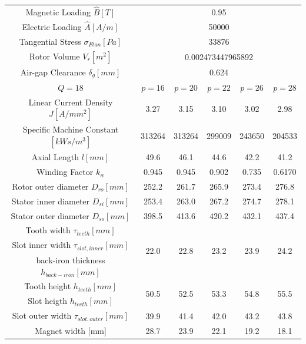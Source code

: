 \documentclass [a4 paper, 11pt, titlepage] {article}
\begin{document}
	\begin{table}[h]
		\begin{center}
			\begin{tabular}{c|c|c|c|c|c}
				Magnetic Loading $\hat{B}[T]$ & \multicolumn{5}{c}{0.95} \\
				Electric Loading $\hat{A}[A/m]$ & \multicolumn{5}{c}{50000} \\
				Tangential Stress $\sigma_{Ftan}[Pa]$ & \multicolumn{5}{c}{33876} \\
				Rotor Volume $V_r [m^2]$ & \multicolumn{5}{c}{0.002473447965892} \\
				Air-gap Clearance $\delta_g [mm]$ & \multicolumn{5}{c}{0.624} \\
				\hline\hline
				$Q=18$ & $p=16$ & $p=20$ & $p=22$ & $p=26$ & $p=28$ \\
				\hline
				Linear Current Density $J [A/mm^2]$ & 3.27 & 3.15 & 3.10 & 3.02 & 2.98 \\
				Specific Machine Constant $[kWs/m^3]$ & 313264 & 313264 & 299009 & 243650 & 204533 \\
				Axial Length $l [mm]$ & 49.6 & 46.1 & 44.6 & 42.2 & 41.2 \\
				Winding Factor $k_w$ & 0.945 & 0.945 & 0.902 & 0.735 & 0.6170 \\
				Rotor outer diameter $D_{ro} [mm]$ & 252.2 & 261.7 & 265.9 & 273.4 & 276.8 \\
				Stator inner diameter $D_{si} [mm]$ & 253.4 & 263.0 & 267.2 & 274.7 & 278.1 \\
				Stator outer diameter $D_{so} [mm]$ & 398.5 & 413.6 & 420.2 & 432.1 & 437.4 \\
				Tooth width $\tau_{teeth} [mm]$ & \multirow{3}{4em}{22.0} & \multirow{3}{4em}{22.8} & \multirow{3}{4em}{23.2} & \multirow{3}{4em}{23.9} & \multirow{3}{4em}{24.2} \\
				Slot inner width $\tau_{slot,inner} [mm]$ & & & & & \\
				back-iron thickness $h_{back-iron} [mm]$ & & & & & \\
				Tooth height $h_{teeth} [mm]$ & \multirow{2}{4em}{50.5} & \multirow{2}{4em}{52.5} & \multirow{2}{4em}{53.3} & \multirow{2}{4em}{54.8} & \multirow{2}{4em}{55.5} \\
				Slot heigth $h_{teeth} [mm]$ &  &  &  &  & \\
				Slot outer width $\tau_{slot,outer} [mm]$ & 39.9 & 41.4 & 42.0 & 43.2 & 43.8 \\
				Magnet width [mm] & 28.7 & 23.9 & 	22.1 & 19.2 & 18.1 \\

\end{tabular}
\end{center}
\end{table}
\end{document}
